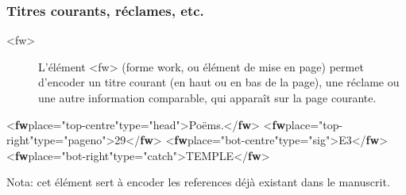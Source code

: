 \documentclass[]{beamer}\makeatletter
\begin{document}
\begin{frame}[fragile]
\frametitle{Titres courants, réclames, etc.}\begin{description}

\item[{\color{blue2}<fw>}]L’élément {\color{blue2}<fw>} (forme work, ou élément de mise en page)       permet d’encoder un titre courant (en haut ou en bas de la page),       une réclame ou une autre information comparable, qui apparaît sur la       page courante.
\end{description} 
\bgroup\ttfamily\fontsize{8.5pt}{9pt}\selectfont\par
\begin{exampleblock}{}
\noindent\ttfamily\mbox{}{\color{blue1}<\textbf{fw}\hspace*{6pt}place="{\color{blue2}top-centre}"\hspace*{6pt}type="{\color{blue2}head}">}Poëms.{\color{blue1}</\textbf{fw}>}\mbox{}\newline 
{\color{blue1}<\textbf{fw}\hspace*{6pt}place="{\color{blue2}top-right}"\hspace*{6pt}type="{\color{blue2}pageno}">}29{\color{blue1}</\textbf{fw}>}\mbox{}\newline 
{\color{blue1}<\textbf{fw}\hspace*{6pt}place="{\color{blue2}bot-centre}"\hspace*{6pt}type="{\color{blue2}sig}">}E3{\color{blue1}</\textbf{fw}>}\mbox{}\newline 
{\color{blue1}<\textbf{fw}\hspace*{6pt}place="{\color{blue2}bot-right}"\hspace*{6pt}type="{\color{blue2}catch}">}TEMPLE{\color{blue1}</\textbf{fw}>}
\end{exampleblock}
\par\egroup
  \par\begin{exampleblock}{}
Nota: cet élément sert à encoder les references déjà existant dans le manuscrit.\end{exampleblock}\par

\end{frame}
\end{document}

